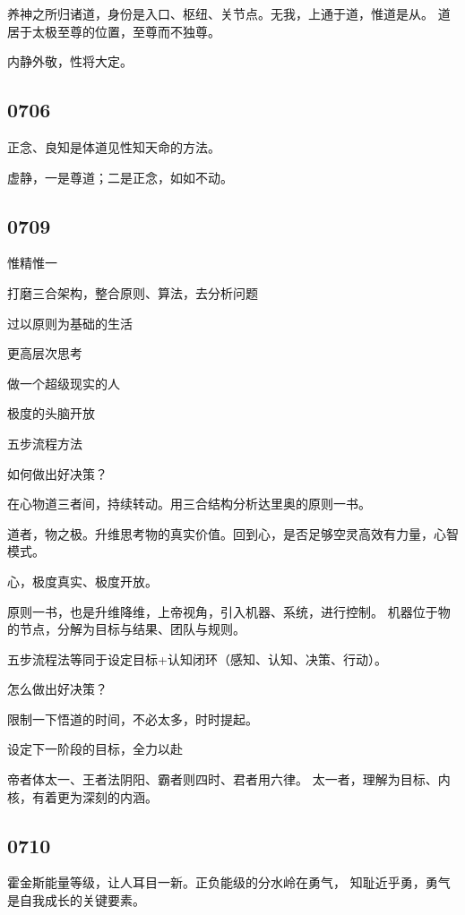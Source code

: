 养神之所归诸道，身份是入口、枢纽、关节点。无我，上通于道，惟道是从。
道居于太极至尊的位置，至尊而不独尊。

内静外敬，性将大定。

\subsection{0706}

正念、良知是体道见性知天命的方法。

虚静，一是尊道；二是正念，如如不动。

\subsection{0709}

惟精惟一

打磨三合架构，整合原则、算法，去分析问题

\begin{enumbox}
\item 过以原则为基础的生活
\item 更高层次思考
\item 做一个超级现实的人
\item 极度的头脑开放
\item 五步流程方法
\item 如何做出好决策？
\end{enumbox}

在心物道三者间，持续转动。用三合结构分析达里奥的原则一书。

道者，物之极。升维思考物的真实价值。回到心，是否足够空灵高效有力量，心智模式。

心，极度真实、极度开放。

原则一书，也是升维降维，上帝视角，引入机器、系统，进行控制。
机器位于物的节点，分解为目标与结果、团队与规则。

五步流程法等同于设定目标+认知闭环（感知、认知、决策、行动）。

怎么做出好决策？

限制一下悟道的时间，不必太多，时时提起。

设定下一阶段的目标，全力以赴

帝者体太一、王者法阴阳、霸者则四时、君者用六律。
太一者，理解为目标、内核，有着更为深刻的内涵。

\subsection{0710}

霍金斯能量等级，让人耳目一新。正负能级的分水岭在勇气，
知耻近乎勇，勇气是自我成长的关键要素。

